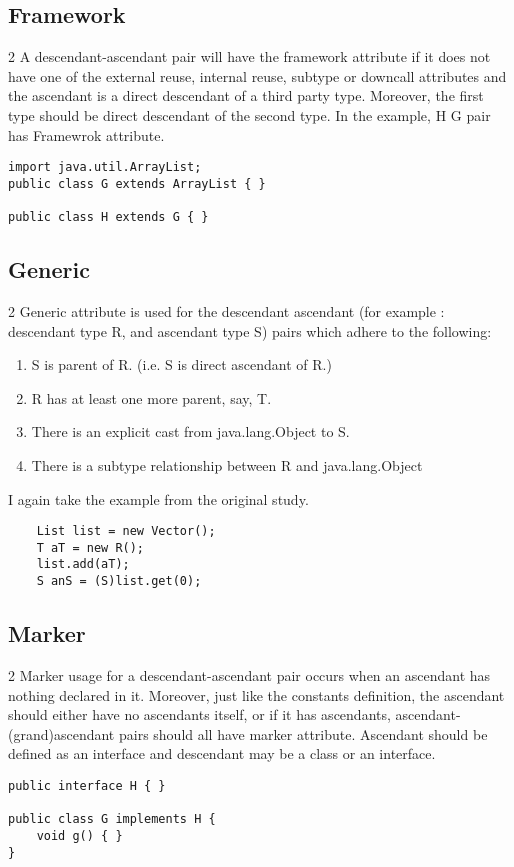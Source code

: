 \documentclass{uvamscse}
\begin{document}
\subsection{Framework} \label{FrameworkDef}
\begin{multicols} {2}
A descendant-ascendant pair will have the framework attribute if it does not have one of the external reuse, internal reuse, subtype or downcall attributes and the ascendant is a direct descendant of a third party type. Moreover, the first type should be direct descendant of the second type. In the example, H G pair has Framewrok attribute.
\columnbreak
\begin{verbatim}
import java.util.ArrayList;
public class G extends ArrayList { }
   
public class H extends G { }
\end{verbatim}
\end{multicols}

\subsection{Generic}  \label{GenericDef}
\begin{multicols} {2}
Generic attribute is used for the descendant ascendant (for example : descendant type R, and ascendant type S) pairs which adhere to the following:
\begin{enumerate}
  \item S is parent of R. (i.e. S is direct ascendant of R.)
  \item R has at least one more parent, say, T.
  \item There is an explicit cast from java.lang.Object to S. 
  \item There is a subtype relationship between R and java.lang.Object
\end{enumerate}
I again take the example from the original study.
\columnbreak
\begin{verbatim}
    List list = new Vector();
    T aT = new R();
    list.add(aT);
    S anS = (S)list.get(0);
\end{verbatim}
\end{multicols}


\subsection{Marker}
\begin{multicols} {2}
Marker usage for a descendant-ascendant pair occurs when an ascendant has nothing declared in it. Moreover, just like the constants definition, the ascendant should either have no ascendants itself, or if it has ascendants, ascendant-(grand)ascendant pairs should all have marker attribute. Ascendant should be defined as an interface and descendant may be a class or an interface. 
\columnbreak
\begin{verbatim}
public interface H { }
   
public class G implements H {
    void g() { }
}
\end{verbatim}
\end{multicols}
\end{document}
